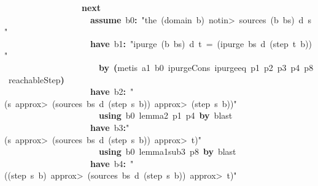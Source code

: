 \documentclass{article}
\newcommand{\syntaxKEYWORDA}[1]{\textcolor[rgb]{0.0,0.4,0.6}{\textbf{#1}}}
\newcommand{\syntaxKEYWORDC}[1]{\textcolor[rgb]{0.0,0.6,1.0}{\textbf{#1}}}
\newcommand{\syntaxLITERALA}[1]{\textcolor[rgb]{1.0,0.0,0.8}{#1}}
\newcommand{\syntaxOPERATOR}[1]{\textcolor[rgb]{0.0,0.0,0.0}{\textbf{#1}}}
\newcommand{\syntaxKEYWORDA}[1]{\textcolor[rgb]{0.0,0.4,0.6}{\textbf{#1}}}
\newcommand{\syntaxKEYWORDC}[1]{\textcolor[rgb]{0.0,0.6,1.0}{\textbf{#1}}}
\newcommand{\syntaxLITERALA}[1]{\textcolor[rgb]{1.0,0.0,0.8}{#1}}
\newcommand{\syntaxOPERATOR}[1]{\textcolor[rgb]{0.0,0.0,0.0}{\textbf{#1}}}
\newcommand{\syntaxKEYWORDA}[1]{\textcolor[rgb]{0.0,0.4,0.6}{\textbf{#1}}}
\newcommand{\syntaxKEYWORDC}[1]{\textcolor[rgb]{0.0,0.6,1.0}{\textbf{#1}}}
\newcommand{\syntaxLITERALA}[1]{\textcolor[rgb]{1.0,0.0,0.8}{#1}}
\newcommand{\syntaxOPERATOR}[1]{\textcolor[rgb]{0.0,0.0,0.0}{\textbf{#1}}}
\newcommand{\syntaxKEYWORDA}[1]{\textcolor[rgb]{0.0,0.4,0.6}{#1}}
\newcommand{\syntaxKEYWORDC}[1]{\textcolor[rgb]{0.0,0.6,1.0}{#1}}
\newcommand{\syntaxLITERALA}[1]{\textcolor[rgb]{1.0,0.0,0.8}{\textbf{#1}}}
\newcommand{\syntaxOPERATOR}[1]{\textcolor[rgb]{0.0,0.0,0.0}{#1}}
\newcommand{\syntaxKEYWORDA}[1]{\textcolor[rgb]{0.0,0.4,0.6}{\textbf{#1}}}
\newcommand{\syntaxKEYWORDC}[1]{\textcolor[rgb]{0.0,0.6,1.0}{\textbf{#1}}}
\newcommand{\syntaxLITERALA}[1]{\textcolor[rgb]{1.0,0.0,0.8}{#1}}
\newcommand{\syntaxOPERATOR}[1]{\textcolor[rgb]{0.0,0.0,0.0}{\textbf{#1}}}
\newcommand{\syntaxKEYWORDA}[1]{\textcolor[rgb]{0.0,0.4,0.6}{\textbf{#1}}}
\newcommand{\syntaxKEYWORDC}[1]{\textcolor[rgb]{0.0,0.6,1.0}{\textbf{#1}}}
\newcommand{\syntaxLITERALA}[1]{\textcolor[rgb]{1.0,0.0,0.8}{#1}}
\newcommand{\syntaxOPERATOR}[1]{\textcolor[rgb]{0.0,0.0,0.0}{\textbf{#1}}}
\begin{document}
{\ }{\ }{\ }{\ }{\ }{\ }{\ }{\ }{\ }{\ }{\ }{\ }{\ }{\ }{\ }{\ }{\ }{\ }\syntaxKEYWORDA{next}\hspace*{\fill}\\
{\ }{\ }{\ }{\ }{\ }{\ }{\ }{\ }{\ }{\ }{\ }{\ }{\ }{\ }{\ }{\ }{\ }{\ }{\ }{\ }\syntaxKEYWORDC{assume}{\ }b0\syntaxOPERATOR{:}{\ }\syntaxLITERALA{"the{\ }(domain{\ }b){\ }\<notin>{\ }sources{\ }(b{\ }\usebox{\hashbox}{\ }bs){\ }d{\ }s"}\hspace*{\fill}\\
{\ }{\ }{\ }{\ }{\ }{\ }{\ }{\ }{\ }{\ }{\ }{\ }{\ }{\ }{\ }{\ }{\ }{\ }{\ }{\ }\syntaxKEYWORDA{have}{\ }b1\syntaxOPERATOR{:}{\ }\syntaxLITERALA{"ipurge{\ }(b{\ }\usebox{\hashbox}{\ }bs){\ }d{\ }t{\ }={\ }(ipurge{\ }bs{\ }d{\ }(step{\ }t{\ }b))"}\hspace*{\fill}\\
{\ }{\ }{\ }{\ }{\ }{\ }{\ }{\ }{\ }{\ }{\ }{\ }{\ }{\ }{\ }{\ }{\ }{\ }{\ }{\ }{\ }{\ }\syntaxKEYWORDA{by}{\ }\syntaxOPERATOR{(}metis{\ }a1{\ }b0{\ }ipurge\usebox{\underscorebox}Cons{\ }ipurge\usebox{\underscorebox}eq{\ }p1{\ }p2{\ }p3{\ }p4{\ }p8{\ }reachableStep\syntaxOPERATOR{)}\hspace*{\fill}\\
{\ }{\ }{\ }{\ }{\ }{\ }{\ }{\ }{\ }{\ }{\ }{\ }{\ }{\ }{\ }{\ }{\ }{\ }{\ }{\ }\syntaxKEYWORDA{have}{\ }b2\syntaxOPERATOR{:}{\ }\syntaxLITERALA{"(s{\ }\<approx>{\ }(sources{\ }bs{\ }d{\ }(step{\ }s{\ }b)){\ }\<approx>{\ }(step{\ }s{\ }b))"}\hspace*{\fill}\\
{\ }{\ }{\ }{\ }{\ }{\ }{\ }{\ }{\ }{\ }{\ }{\ }{\ }{\ }{\ }{\ }{\ }{\ }{\ }{\ }{\ }{\ }\syntaxKEYWORDA{using}{\ }b0{\ }lemma\usebox{\underscorebox}2{\ }p1{\ }p4{\ }\syntaxKEYWORDA{by}{\ }blast\hspace*{\fill}\\
{\ }{\ }{\ }{\ }{\ }{\ }{\ }{\ }{\ }{\ }{\ }{\ }{\ }{\ }{\ }{\ }{\ }{\ }{\ }{\ }\syntaxKEYWORDA{have}{\ }b3\syntaxOPERATOR{:}\syntaxLITERALA{"(s{\ }\<approx>{\ }(sources{\ }bs{\ }d{\ }(step{\ }s{\ }b)){\ }\<approx>{\ }t)"}\hspace*{\fill}\\
{\ }{\ }{\ }{\ }{\ }{\ }{\ }{\ }{\ }{\ }{\ }{\ }{\ }{\ }{\ }{\ }{\ }{\ }{\ }{\ }{\ }{\ }\syntaxKEYWORDA{using}{\ }b0{\ }lemma\usebox{\underscorebox}1\usebox{\underscorebox}sub\usebox{\underscorebox}3{\ }p8{\ }\syntaxKEYWORDA{by}{\ }blast\hspace*{\fill}\\
{\ }{\ }{\ }{\ }{\ }{\ }{\ }{\ }{\ }{\ }{\ }{\ }{\ }{\ }{\ }{\ }{\ }{\ }{\ }{\ }\syntaxKEYWORDA{have}{\ }b4\syntaxOPERATOR{:}{\ }\syntaxLITERALA{"((step{\ }s{\ }b){\ }\<approx>{\ }(sources{\ }bs{\ }d{\ }(step{\ }s{\ }b)){\ }\<approx>{\ }t)"}\hspace*{\fill}\\
\end{document}

